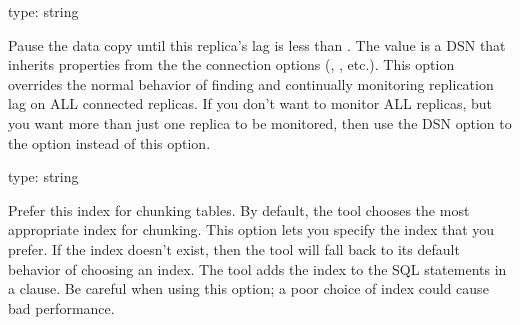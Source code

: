 \documentclass[letterpaper,10pt,english]{sphinxmanual}
\begin{document}
\begin{fulllineitems}
\label{\detokenize{mariadb-schema-change:cmdoption-mariadb-schema-change-check-slave-lag}}
type: string

Pause the data copy until this replica’s lag is less than {\hyperref[\detokenize{mariadb-schema-change:cmdoption-mariadb-schema-change-max-lag}]{}}.  The
value is a DSN that inherits properties from the the connection options
({\hyperref[\detokenize{mariadb-schema-change:cmdoption-mariadb-schema-change-port}]{}}, {\hyperref[\detokenize{mariadb-schema-change:cmdoption-mariadb-schema-change-user}]{}}, etc.).  This option overrides the normal behavior of
finding and continually monitoring replication lag on ALL connected replicas.
If you don’t want to monitor ALL replicas, but you want more than just one
replica to be monitored, then use the DSN option to the {\hyperref[\detokenize{mariadb-schema-change:cmdoption-mariadb-schema-change-recursion-method}]{}}
option instead of this option.

\end{fulllineitems}


\begin{fulllineitems}
\label{\detokenize{mariadb-schema-change:cmdoption-mariadb-schema-change-chunk-index}}
type: string

Prefer this index for chunking tables.  By default, the tool chooses the most
appropriate index for chunking.  This option lets you specify the index that you
prefer.  If the index doesn’t exist, then the tool will fall back to its default
behavior of choosing an index.  The tool adds the index to the SQL statements in
a  clause.  Be careful when using this option; a poor choice of
index could cause bad performance.

\end{fulllineitems}
\end{document}
